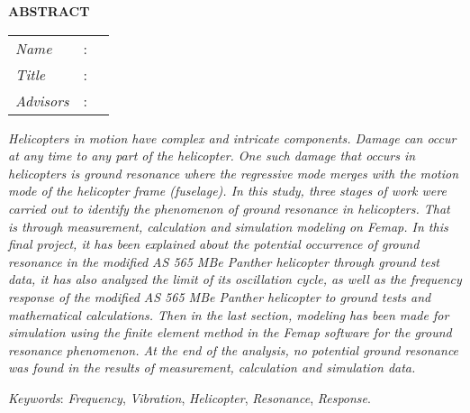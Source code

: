 \begin{center}
  \large\textbf{ABSTRACT}
\end{center}


\vspace{2ex}

\begingroup
\setlength{\tabcolsep}{0pt}

\noindent
\begin{tabularx}{\textwidth}{l >{\centering}m{3em} X}
  \emph{Name}     & : & \name{}         \\

  \emph{Title}    & : & \engtatitle{}   \\

  \emph{Advisors} & : & \advisor{}   \\
  
\end{tabularx}
\endgroup

\emph{Helicopters in motion have complex and intricate components. Damage can occur at any time to any part of the helicopter. One such damage that occurs in helicopters is ground resonance where the regressive mode merges with the motion mode of the helicopter frame (fuselage). In this study, three stages of work were carried out to identify the phenomenon of ground resonance in helicopters. That is through measurement, calculation and simulation modeling on Femap. In this final project, it has been explained about the potential occurrence of ground resonance in the modified AS 565 MBe Panther helicopter through ground test data, it has also analyzed the limit of its oscillation cycle, as well as the frequency response of the modified AS 565 MBe Panther helicopter to ground tests and mathematical calculations. Then in the last section, modeling has been made for simulation using the finite element method in the Femap software for the ground resonance phenomenon. At the end of the analysis, no potential ground resonance was found in the results of measurement, calculation and simulation data.}

\emph{Keywords}: \emph{Frequency}, \emph{Vibration}, \emph{Helicopter}, \emph{Resonance}, \emph{Response}.
